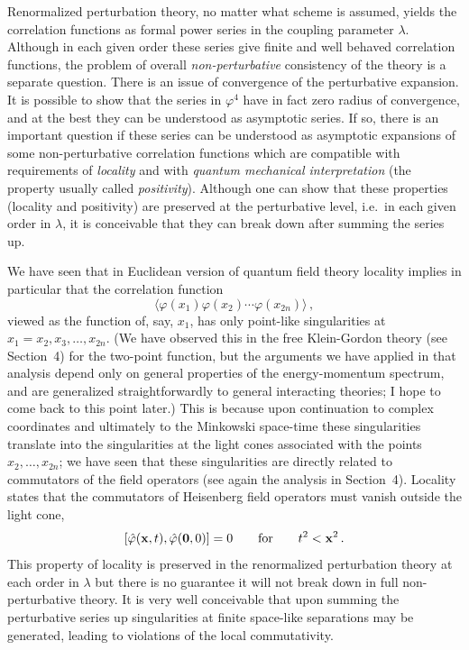 Renormalized perturbation theory, no matter what scheme is assumed, yields the
correlation functions as formal power series in the coupling parameter
$\lambda$. Although in each given order these series give finite and well
behaved correlation functions, the problem of overall \emph{non-perturbative}
consistency of the theory is a separate question. There is an issue of
convergence of the perturbative expansion. It is possible to show that the
series in $\varphi^4$ have in fact zero radius of convergence, and at the best
they can be understood as asymptotic series. If so, there is an important
question if these series can be understood as asymptotic expansions of some
non-perturbative correlation functions which are compatible with requirements of
\emph{locality} and with \emph{quantum mechanical interpretation} (the property
usually called \emph{positivity}). Although one can show that these properties
(locality and positivity) are preserved at the perturbative level, i.e.\ in each
given order in $\lambda$, it is conceivable that they can break down after
summing the series up.

We have seen that in Euclidean version of quantum field theory locality implies
in particular that the correlation function
\[
\bigl\langle\varphi(x_1)\varphi(x_2)\cdots\varphi(x_{2n})\bigr\rangle\,,
\]
viewed as the function of, say, $x_1$, has only point-like singularities at
$x_1=x_2,x_3,\dots,x_{2n}$. (We have observed this in the free Klein-Gordon
theory (see Section~4) for the two-point function, but the arguments we have
applied in that analysis depend only on general properties of the
energy-momentum spectrum, and are generalized straightforwardly to general
interacting theories; I hope to come back to this point later.) This is because
upon continuation to complex coordinates and ultimately to the Minkowski
space-time these singularities translate into the singularities at the light
cones associated with the points $x_2,\dots,x_{2n}$; we have seen that these
singularities are directly related to commutators of the field operators (see
again the analysis in Section~4). Locality states that the commutators of
Heisenberg field operators must vanish outside the light cone,
\[
[\hat\varphi(\mathbf{x},t),\hat\varphi(\mathbf0,0)]=0\qquad\text{for}\qquad t^2<\mathbf{x}^2\,.
\]
This property of locality is preserved in the renormalized perturbation theory at
each order in $\lambda$ but there is no guarantee it will not break down in full
non-perturbative theory. It is very well conceivable that upon summing the
perturbative series up singularities at finite space-like separations may be
generated, leading to violations of the local commutativity.

